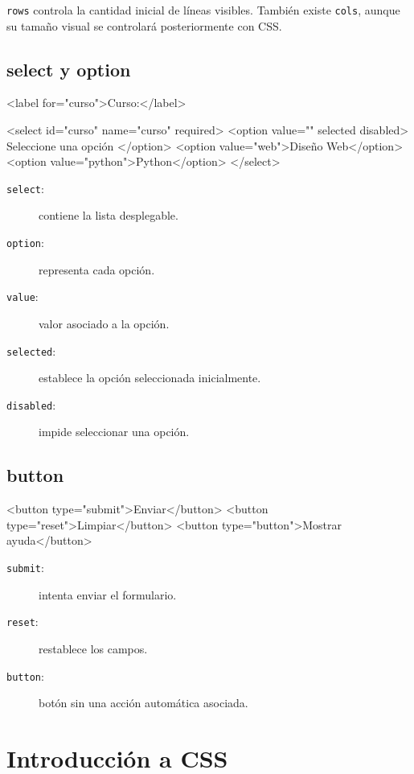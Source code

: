 \documentclass[11pt]{article}
\begin{document}
\texttt{rows} controla la cantidad inicial de líneas visibles. También existe \texttt{cols}, aunque su tamaño
visual se controlará posteriormente con CSS.

\subsection{select y option}

\begin{htmlcodedark}
    <label for="curso">Curso:</label>

    <select id="curso" name="curso" required>
    <option value="" selected disabled>
    Seleccione una opción
    </option>
    <option value="web">Diseño Web</option>
    <option value="python">Python</option>
    </select>
\end{htmlcodedark}

\begin{description}
    \item[\texttt{select}:] contiene la lista desplegable.
    \item[\texttt{option}:] representa cada opción.
    \item[\texttt{value}:] valor asociado a la opción.
    \item[\texttt{selected}:] establece la opción seleccionada inicialmente.
    \item[\texttt{disabled}:] impide seleccionar una opción.
\end{description}

\subsection{button}

\begin{htmlcodedark}
    <button type="submit">Enviar</button>
    <button type="reset">Limpiar</button>
    <button type="button">Mostrar ayuda</button>
\end{htmlcodedark}

\begin{description}
    \item[\texttt{submit}:] intenta enviar el formulario.
    \item[\texttt{reset}:] restablece los campos.
    \item[\texttt{button}:] botón sin una acción automática asociada.
\end{description}

    \section{Introducción a CSS}
\end{document}
